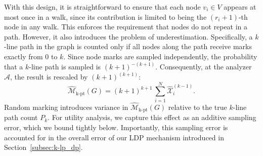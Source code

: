 \begin{algorithm}
\small
\caption{Local client function $\widehat{\mathcal{R}}^{(\ell)}$ of $\widehat{\mathcal{M}}_{\mathrm{k\text{-}pt}}$}
\label{alg:k-lp_nondp}
\SetNoFillComment



\Fn{\rnew{$G_i$}}{


\If{$\ell = \text{mark}$}{
    \tcc{Randomly sample a mark}
    $r_i \gets \textsf{Unif}(0,k)$

     \textbf{Send out} $r_i$ to $\mathcal{N}(i)$
   
    }

\If{$\ell = r_i$}{

Received $\widehat{\mathcal{X}}^{(\ell-1)}_j$ for each $j \in \mathcal{N}(i)$


  
        $\widehat{\mathcal{X}}^{(\ell)}_i 
        \leftarrow 
        \sum_{j \in \mathcal{N}(i)} 
        \widehat{\mathcal{X}}^{(\ell-1)}_j \, \mathbf{1}\{r_j = {\ell -1}\}$\\

    \If{$\ell = k-1$}{
        $\widehat{\mathcal{X}}^{(\ell)}_i 
        \leftarrow 
        \widehat{\mathcal{X}}^{(\ell)}_i \cdot \sum_{j \in \mathcal{N}(i)} \mathbf{1}\{r_j = k\}$\\
    }

}
\Else{
     $\widehat{\mathcal{X}}^{(\ell)}_i \leftarrow 0$
}


 \textbf{Send out} $\widehat{\mathcal{X}}^{(\ell)}_i$ to $\mathcal{N}(i)$ and $\mathcal{A}$
}
\end{algorithm}



With this design, it is straightforward to ensure that each node $v_i \in V$ appears at most once in a walk, since its contribution is limited to being the $(r_i+1)$-th node in any walk. 
This enforces the requirement that nodes do not repeat in a path.
However, it also introduces the problem of underestimation. 
Specifically, a $k$-line path in the graph is counted only if all nodes along the path receive marks exactly from $0$ to $k$. 
Since node marks are sampled independently, the probability that a $k$-line path is sampled is $(k+1)^{-(k+1)}$. 
Consequently, at the analyzer $\mathcal{A}$, the result is rescaled by $(k+1)^{(k+1)}$:
\begin{equation*}
     \widehat{\mathcal{M}}_{\mathrm{k\text{-}pt}}(G) = (k+1)^{k+1} \, 
     \sum_{i=1}^N \widehat{\mathcal{X}}^{(k-1)}_i.
\end{equation*}
{Random marking introduces variance in  $\widehat{\mathcal{M}}_{\mathrm{k\text{-}pt}}(G)$ relative to the true $k$-line path count $P_k$. 
For utility analysis, we capture this effect as an additive sampling error, which we bound tightly below. 
Importantly, this sampling error is accounted for in the overall error of our LDP mechanism introduced in Section~\ref{subsec:k-lp_dp}.
}





